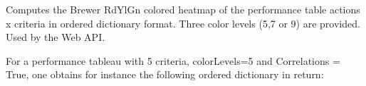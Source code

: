 \documentclass[letterpaper,10pt,english]{sphinxmanual}
\begin{document}
\begin{fulllineitems}
\begin{fulllineitems}
\end{fulllineitems}


\begin{fulllineitems}
\label{techDoc:perfTabs.PerformanceTableau.computeMCSRPerformanceHeatmap}
Computes the Brewer RdYlGn colored heatmap of the performance table
actions x criteria in ordered dictionary format. Three color levels (5,7 or 9)
are provided. Used by the Web API.

For a performance tableau with 5 criteria, colorLevels=5 and
Correlations = True, one obtains for instance
the following ordered dictionary in return:


\end{fulllineitems}
\end{fulllineitems}
\end{document}
